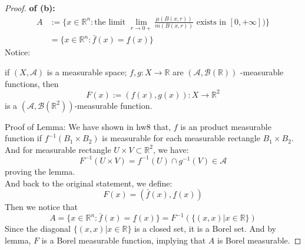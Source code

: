 \documentclass[lang=cn,11pt]{elegantbook}
\begin{document}
\begin{proof}
    \textbf{of (b): }\begin{align*}
        A&:=\{x\in\mathbb{R}^n :\text{the limit $\lim_{r\to0+}\frac{\mu(B(x,r))}{m(B(x,r))}$ exists in $[0,+\infty]$)}\}   \\
        & = \{x\in\mathbb{R}^n: \bar{f}(x) =  \underline{f}(x)\}
    \end{align*}
Notice:
\begin{lemma}
    if $(X, \mathcal{A})$ is a measurable space; $f, g : X \to \mathbb{R} $ are $( \mathcal{A}, \mathcal{B}(\mathbb{R}))$ -measurable functions, then \[
F(x) := (f(x), g(x)) \colon X \to \mathbb{R}^2
\]is a $( \mathcal{A}, \mathcal{B}(\mathbb{R}^2))$-measurable function.
\end{lemma}
Proof of Lemma: We have shown in hw8 that, $f$ is an product measurable function if $f^{-1}\left(B_1 \times B_2\right) $  is measurable for each measurable rectangle $B_1 \times B_2$.\\
And for measurable rectangle $U \times V \subset \mathbb{R}^2$, we have:
$$
F^{-1}(U \times V)=f^{-1}(U) \cap g^{-1}(V) \in \mathcal{A}
$$
proving the lemma.\\
And back to the original statement, we define: \[
F(x) =  (\bar{f}(x),  \underline{f}(x) )
\]
Then we notice that \[
A = \{x\in\mathbb{R}^n: \bar{f}(x) =  \underline{f}(x)\} = F^{-1} (\{(x,x) | x \in \mathbb{R} \})
\]
Since the diagonal $\{(x,x) | x \in \mathbb{R} \}$ is a closed set, it is a Borel set. And by lemma, $F$ is a Borel measurable function, implying that $A$ is Borel measurable.
\end{proof}
\end{document}
